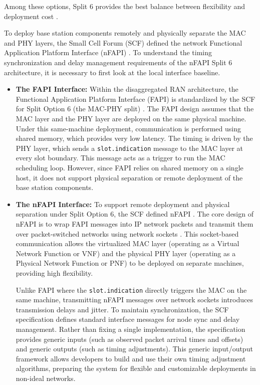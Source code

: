 \documentclass[../my_ntust_thesis.tex]{subfiles}
\begin{document}
Among these options, Split 6 provides the best balance between flexibility and deployment cost \cite{10014970}.

To deploy base station components remotely and physically separate the MAC and PHY layers, the Small Cell Forum (SCF) defined the network Functional Application Platform Interface (nFAPI) \cite{SCF225}. To understand the timing synchronization and delay management requirements of the nFAPI Split 6 architecture, it is necessary to first look at the local interface baseline.

\begin{itemize}
\item \textbf{The FAPI Interface:} Within the disaggregated RAN architecture, the Functional Application Platform Interface (FAPI) is standardized by the SCF for Split Option 6 (the MAC-PHY split) \cite{SCF222}. The FAPI design assumes that the MAC layer and the PHY layer are deployed on the same physical machine. Under this same-machine deployment, communication is performed using shared memory, which provides very low latency. The timing is driven by the PHY layer, which sends a \texttt{slot.indication} message to the MAC layer at every slot boundary. This message acts as a trigger to run the MAC scheduling loop. However, since FAPI relies on shared memory on a single host, it does not support physical separation or remote deployment of the base station components.

\item \textbf{The nFAPI Interface:} To support remote deployment and physical separation under Split Option 6, the SCF defined nFAPI \cite{SCF225}. The core design of nFAPI is to wrap FAPI messages into IP network packets and transmit them over packet-switched networks using network sockets \cite{douros2018nfapi}. This socket-based communication allows the virtualized MAC layer (operating as a Virtual Network Function or VNF) and the physical PHY layer (operating as a Physical Network Function or PNF) to be deployed on separate machines, providing high flexibility.

Unlike FAPI where the \texttt{slot.indication} directly triggers the MAC on the same machine, transmitting nFAPI messages over network sockets introduces transmission delays and jitter. To maintain synchronization, the SCF specification defines standard interface messages for node sync and delay management. Rather than fixing a single implementation, the specification provides generic inputs (such as observed packet arrival times and offsets) and generic outputs (such as timing adjustments). This generic input/output framework allows developers to build and use their own timing adjustment algorithms, preparing the system for flexible and customizable deployments in non-ideal networks.


\end{itemize}
\end{document}
